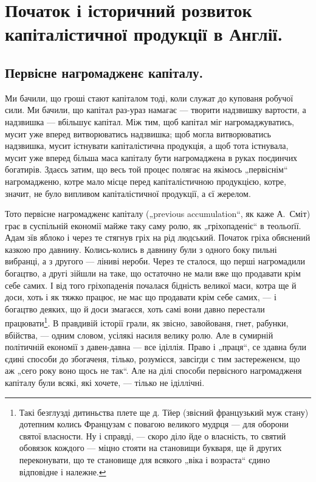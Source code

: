 \section*{Початок і історичний розвиток
капіталістичної продукції в Англії.}

\subsection{Первісне нагромадженє капіталу.}

Ми бачили, що гроші стают капіталом тоді, коли служат
до купованя робучої сили. Ми бачили, що капітал
раз-ураз намагає — творити надзвишку вартости, а надзвишка —
вбільшує капітал. Між тим, щоб капітал міг нагромаджуватись,
мусит уже вперед витворюватись надзвишка;
щоб могла витворюватись надзвишка, мусит істнувати капіталістична
продукція, а щоб тота істнувала, мусит уже
вперед більша маса капіталу бути нагромаджена в руках
поєдинчих богатирів. Здаєсь затим, що весь той процес
полягає на якімось „первіснім“ нагромадженю, котре мало
місце перед капіталістичною продукцією, котре, значит, не
було випливом капіталістичної продукції, а єї жерелом.

Тото первісне нагромадженє капіталу („previous accumulation“,
як каже А.~Сміт) грає в суспільній економії
майже таку саму ролю, як „гріхопаденіє“ в теольоґії. Адам
зїв яблоко і через те стягнув гріх на рід людський. Початок
гріха обяснений казкою про давнину. Колись-колись
в давнину були з одного боку пильні вибранці, а з другого —
ліниві нероби. Через те сталося, що перші нагромадили
богацтво, а другі зійшли на таке, що остаточно не мали
вже що продавати крім себе самих. І від того гріхопаденія
почалася бідність великої маси, котра ще й доси, хоть і як
тяжко працює, не має що продавати крім себе самих, —
і богацтво деяких, що й доси змагаєся, хоть самі вони
давно перестали працювати\footnote{
Такі безглузді дитиньства плете ще д. Тйер (звісний французький
муж стану) дотепним колись Французам с повагою великого мудрця —
для оборони святої власности. Ну і справді, — скоро діло йде о власність,
то святий обовязок кождого — міцно стояти на становищи букваря,
ще й других переконувати, що те становище для всякого „віка
і возраста“ єдино відповідне і належне.
}. В правдивій історії грали, як
звісно, завойованя, гнет, рабунки, вбійства, — одним словом,
усілякі насиля велику ролю. Але в сумирній політичній
економії з давен-давна — все іділлія. Право і „праця“, се
здавна були єдині способи до збогаченя, тілько, розумієся,
завсігди с тим застереженєм, що аж „сего року воно щось
не так“. Але на ділі способи первісного нагромадженя капіталу
були всякі, які хочете, — тілько не іділлічні.


